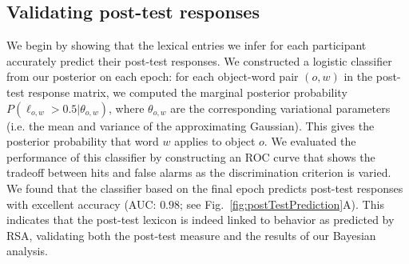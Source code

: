 

\subsection{Validating post-test responses}

We begin by showing that the lexical entries we infer for each participant accurately predict their post-test responses. 
We constructed a logistic classifier from our posterior on each epoch: for each object-word pair $(o,w)$ in the post-test response matrix, we computed the marginal posterior probability $P(\ell_{o,w} > 0.5| \theta_{o,w})$, where $\theta_{o,w}$ are the corresponding variational parameters (i.e. the mean and variance of the approximating Gaussian). This gives the posterior probability that word $w$ applies to object $o$. We evaluated the performance of this classifier by constructing an ROC curve that shows the tradeoff between hits and false alarms as the discrimination criterion is varied. We found that the classifier based on the final epoch predicts post-test responses with excellent accuracy (AUC: $0.98$; see Fig.\ \ref{fig:postTestPrediction}A). This indicates that the post-test lexicon is indeed linked to behavior as predicted by RSA, validating both the post-test measure and the results of our Bayesian analysis.

